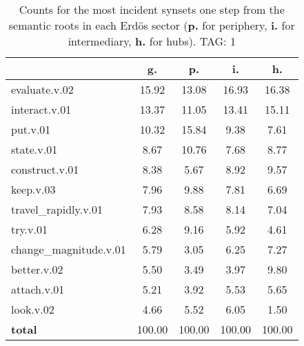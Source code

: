 \begin{table}[h!]
\begin{center}
\begin{tabular}{| l || c | c | c | c |}\hline
 & {\bf g.} & {\bf p.} & {\bf i.} & {\bf h.} \\\hline\hline
evaluate.v.02 & 15.92  & 13.08  & 16.93  & 16.38 \\\hline
interact.v.01 & 13.37  & 11.05  & 13.41  & 15.11 \\\hline
put.v.01 & 10.32  & 15.84  & 9.38  & 7.61 \\\hline
state.v.01 & 8.67  & 10.76  & 7.68  & 8.77 \\\hline
construct.v.01 & 8.38  & 5.67  & 8.92  & 9.57 \\\hline
keep.v.03 & 7.96  & 9.88  & 7.81  & 6.69 \\\hline
travel\_rapidly.v.01 & 7.93  & 8.58  & 8.14  & 7.04 \\\hline
try.v.01 & 6.28  & 9.16  & 5.92  & 4.61 \\\hline
change\_magnitude.v.01 & 5.79  & 3.05  & 6.25  & 7.27 \\\hline
better.v.02 & 5.50  & 3.49  & 3.97  & 9.80 \\\hline
attach.v.01 & 5.21  & 3.92  & 5.53  & 5.65 \\\hline
look.v.02 & 4.66  & 5.52  & 6.05  & 1.50 \\\hline\hline
{{\bf total}} & 100.00  & 100.00  & 100.00  & 100.00 \\\hline
\end{tabular}
\caption{Counts for the most incident synsets one step from the semantic roots in each Erd\"os sector ({\bf p.} for periphery, {\bf i.} for intermediary, {\bf h.} for hubs). TAG: 1}
\end{center}
\end{table}